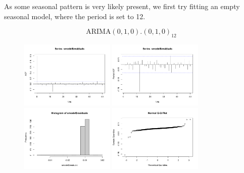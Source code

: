 \documentclass[a4paper,11pt]{article}
\begin{document}
    As some seasonal pattern is very likely present, we first try fitting an empty seasonal model, where the period is set to 12.

    \[\text{ARIMA}(0,1,0).(0,1,0)_{12}\]

    \begin{figure}[H]
        \centering
        \includegraphics[width=0.4\textwidth]{figure-markdown_strict/unnamed-chunk-3-1.png}
        \includegraphics[width=0.4\textwidth]{figure-markdown_strict/unnamed-chunk-3-2.png}
        \includegraphics[width=0.4\textwidth]{figure-markdown_strict/unnamed-chunk-3-3.png}
        \includegraphics[width=0.4\textwidth]{figure-markdown_strict/unnamed-chunk-3-4.png}
        \label{fig:f5}
    \end{figure}
\end{document}
